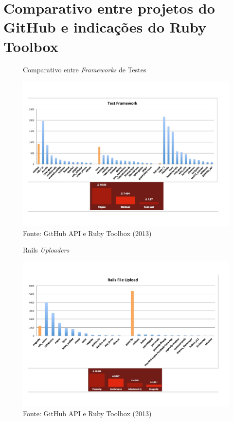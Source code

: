 \chapter{Comparativo entre projetos do GitHub e indicações do Ruby Toolbox}

\begin{figure}[ht]
	\centering
    \caption{Comparativo entre \textit{Frameworks} de Testes}
    \includegraphics[width=15cm]{Imagens/gems-1.jpg}
	\caption*{Fonte: GitHub API e Ruby Toolbox (2013)}
\end{figure}
\begin{figure}[ht]
	\centering
    \caption{Rails \textit{Uploaders}}
    \includegraphics[width=15cm]{Imagens/gems-2.jpg}
	\caption*{Fonte: GitHub API e Ruby Toolbox (2013)}
\end{figure}
